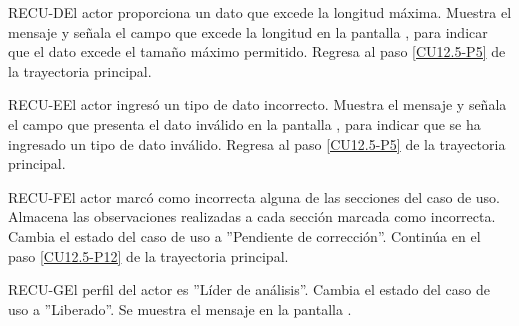 	\begin{UCtrayectoriaA}{RECU-D}{El actor proporciona un dato que excede la longitud máxima.}
		\UCpaso[\UCsist] Muestra el mensaje  y señala el campo que excede la longitud en la pantalla , para indicar que el dato excede el tamaño máximo permitido.
		\UCpaso Regresa al paso \ref{CU12.5-P5} de la trayectoria principal.
	\end{UCtrayectoriaA}

	\begin{UCtrayectoriaA}{RECU-E}{El actor ingresó un tipo de dato incorrecto.}
		\UCpaso[\UCsist] Muestra el mensaje  y señala el campo que presenta el dato inválido en la pantalla , para indicar que se ha ingresado un tipo de dato inválido.
		\UCpaso Regresa al paso \ref{CU12.5-P5} de la trayectoria principal.
	\end{UCtrayectoriaA}

	\begin{UCtrayectoriaA}{RECU-F}{El actor marcó como incorrecta alguna de las secciones del caso de uso.}
		\UCpaso[\UCsist] Almacena las observaciones realizadas a cada sección marcada como incorrecta.
		\UCpaso[\UCsist] Cambia el estado del caso de uso a ''Pendiente de corrección''.
		\UCpaso Continúa en el paso \ref{CU12.5-P12} de la trayectoria principal.
	\end{UCtrayectoriaA}

	\begin{UCtrayectoriaA}{RECU-G}{El perfil del actor es ''Líder de análisis''.}
		\UCpaso[\UCsist] Cambia el estado del caso de uso a ''Liberado''.
		\UCpaso[\UCsist] Se muestra el mensaje  en la pantalla .
	\end{UCtrayectoriaA}